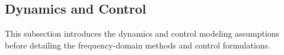 \documentclass[a4paper,fleqn,colorlinks,unicode,lineno]{cas-dc} %
\begin{document}




\subsection{Dynamics and Control}\label{sec:dynamics}
This subsection introduces the dynamics and control modeling assumptions before detailing the frequency-domain methods and control formulations.
\end{document}
